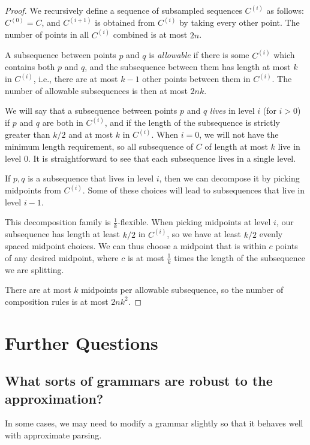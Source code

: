 \begin{proof}
  We recursively define a sequence of subsampled sequences $C^{(i)}$ as
  follows: $C^{(0)} = C$, and $C^{(i+1)}$ is obtained from $C^{(i)}$
  by taking every other point. The number of points in all $C^{(i)}$
  combined is at most $2n$.

  A subsequence between points $p$ and $q$ is \emph{allowable} if
  there is some $C^{(i)}$ which contains both $p$ and $q$, and the
  subsequence between them has length at most $k$ in $C^{(i)}$, i.e.,
  there are at most $k-1$ other points between them in $C^{(i)}$. The
  number of allowable subsequences is then at most $2nk$.

  We will say that a subsequence between points $p$ and $q$
  \emph{lives} in level $i$ (for $i>0$) if $p$ and $q$ are both in
  $C^{(i)}$, and if the length of the subsequence is strictly greater
  than $k/2$ and at most $k$ in $C^{(i)}$. When $i=0$, we will not
  have the minimum length requirement, so all subsequence of $C$ of
  length at most $k$ live in level $0$. It is straightforward to see
  that each subsequence lives in a single level.

  If $p,q$ is a subsequence that lives in level $i$, then we can
  decompose it by picking midpoints from $C^{(i)}$. Some of these
  choices will lead to subsequences that live in level $i-1$.

  This decomposition family is $\frac{1}{k}$-flexible. When picking
  midpoints at level $i$, our subsequence has length at least $k/2$ in
  $C^{(i)}$, so we have at least $k/2$ evenly spaced midpoint
  choices. We can thus choose a midpoint that is within $c$ points of
  any desired midpoint, where $c$ is at most $\frac{1}{k}$ times the
  length of the subsequence we are splitting.
  
  There are at most $k$ midpoints per allowable subsequence, so the number
  of composition rules is at most $2nk^2$.
\end{proof}


\section{Further Questions}

\subsection{What sorts of grammars are robust to the approximation?}
In some cases, we may need to modify a grammar slightly so that it
behaves well with approximate parsing.

